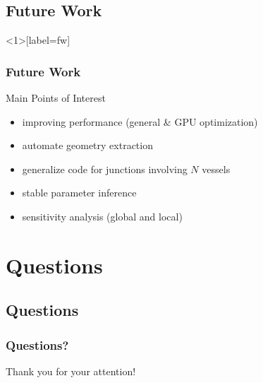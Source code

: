 \documentclass[compress]{beamer}
\begin{document}
\subsection{Future Work}
\begin{frame}<1>[label=fw]
	\frametitle{Future Work}
	\begin{block}{Main Points of Interest}
		\begin{itemize}
			\item<2-> improving performance (general \& GPU optimization)
			\item<3-> automate geometry extraction
			\item<4-> generalize code for junctions involving $N$ vessels
			\item<5-> stable parameter inference
			\item<6-> sensitivity analysis (global and local)
		\end{itemize}
	\end{block}
	\vspace{5mm}
\end{frame}


\section{Questions}
\subsection{Questions}
\begin{frame}
	\frametitle{Questions?}
	Thank you for your attention!
\end{frame}
\end{document}
